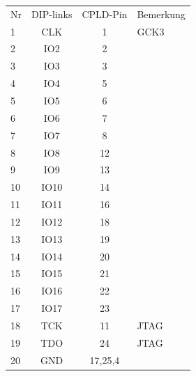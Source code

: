 \documentclass{article}
\begin{document}
\begin{minipage}{0.55\textwidth}
	\begin{tabular}{l|c|c|l}
		Nr & DIP-links	& CPLD-Pin & Bemerkung\\
		\rowcolor[gray]{.8}	1 & CLK		& 1 &	GCK3\\
		2 & IO2		& 2 &\\
		\rowcolor[gray]{.8}	3 & IO3		& 3 &\\
		4 & IO4		& 5 &\\
		\rowcolor[gray]{.8}	5 & IO5		& 6 &\\
		6 & IO6		& 7 &\\
		\rowcolor[gray]{.8}	7 & IO7		& 8 &\\
		8 & IO8		& 12 &\\
		\rowcolor[gray]{.8}	9 & IO9		& 13 &\\
		10 & IO10	& 14 &\\
		\rowcolor[gray]{.8}	11 & IO11	& 16 &\\
		12 & IO12	& 18 &\\
		\rowcolor[gray]{.8}	13 & IO13	& 19 &\\
		14 & IO14	& 20 &\\
		\rowcolor[gray]{.8}	15 & IO15	& 21 &\\
		16 & IO16	& 22 &\\
		\rowcolor[gray]{.8}	17 & IO17	& 23 &\\
		18 & TCK		& 11 &	JTAG\\
		\rowcolor[gray]{.8}	19 & TDO		& 24 &	JTAG\\	
		20 & GND		& 17,25,4 & 	 
	\end{tabular}
\end{minipage}
\end{document}
